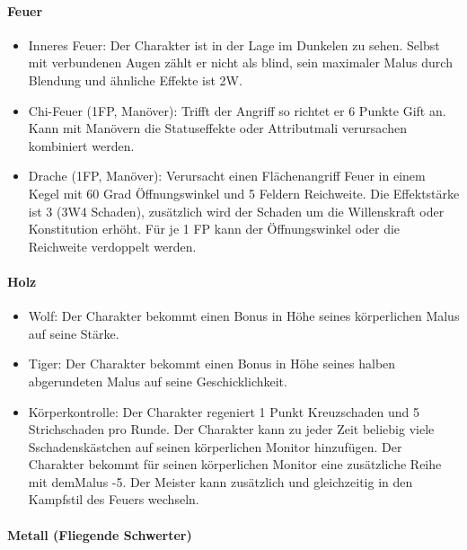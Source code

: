 \documentclass{article}
\begin{document}
\paragraph{Feuer}

\begin{itemize}
\item Inneres Feuer: Der Charakter ist in der Lage im Dunkelen zu sehen. Selbst mit verbundenen Augen zählt er nicht als blind, sein maximaler Malus durch Blendung und ähnliche Effekte ist 2W.
\item Chi-Feuer (1FP, Manöver): Trifft der Angriff so richtet er 6 Punkte Gift an. Kann mit Manövern die Statuseffekte oder Attributmali verursachen kombiniert werden.
\item Drache (1FP, Manöver): Verursacht einen Flächenangriff Feuer in einem Kegel mit 60 Grad Öffnungswinkel und 5 Feldern Reichweite. Die Effektstärke ist 3 (3W4 Schaden), zusätzlich wird der Schaden um die Willenskraft oder Konstitution erhöht. Für je 1 FP kann der Öffnungswinkel oder die Reichweite verdoppelt werden.
\end{itemize}

\paragraph{Holz}

\begin{itemize}
\item Wolf: Der Charakter bekommt einen Bonus in Höhe seines körperlichen Malus auf seine Stärke.
\item Tiger: Der Charakter bekommt einen Bonus in Höhe seines halben abgerundeten Malus auf seine Geschicklichkeit.
\item Körperkontrolle: Der Charakter regeniert 1 Punkt Kreuzschaden und 5 Strichschaden pro Runde. Der Charakter kann zu jeder Zeit beliebig viele Sschadenskästchen auf seinen körperlichen Monitor hinzufügen. Der Charakter bekommt für seinen körperlichen Monitor eine zusätzliche Reihe mit demMalus -5. Der Meister kann zusätzlich und gleichzeitig in den Kampfstil des Feuers wechseln.
\end{itemize}

\paragraph{Metall (Fliegende Schwerter)}
\end{document}
